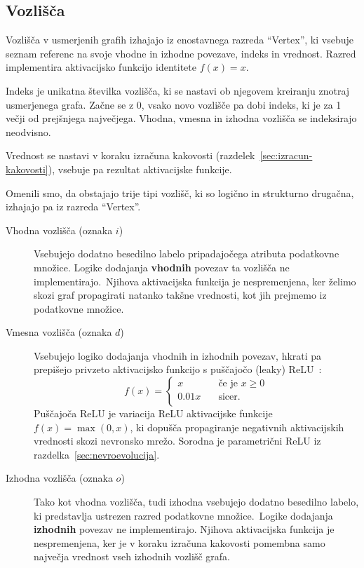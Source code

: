 \documentclass[a4paper,12pt,openright]{book}
\begin{document}
    \subsection{Vozlišča}\label{subsec:vozlisca}
    Vozlišča v usmerjenih grafih izhajajo iz enostavnega razreda \enquote{Vertex}, ki vsebuje seznam referenc
    na svoje vhodne in izhodne povezave, indeks in vrednost.
    Razred implementira aktivacijsko funkcijo identitete $f(x)=x$.

    Indeks je unikatna številka vozlišča, ki se nastavi ob njegovem kreiranju znotraj usmerjenega grafa.
    Začne se z 0, vsako novo vozlišče pa dobi indeks, ki je za 1 večji od prejšnjega največjega.
    Vhodna, vmesna in izhodna vozlišča se indeksirajo neodvisno.

    Vrednost se nastavi v koraku izračuna kakovosti (razdelek~\ref{sec:izracun-kakovosti}), vsebuje pa rezultat aktivacijske funkcije.

    Omenili smo, da obstajajo trije tipi vozlišč, ki so logično in strukturno drugačna, izhajajo
    pa iz razreda \enquote{Vertex}.
    \begin{description}
        \item[Vhodna vozlišča (oznaka $i$)]{Vsebujejo dodatno besedilno labelo pripadajočega atributa podatkovne množice.
        Logike dodajanja \textbf{vhodnih} povezav ta vozlišča ne implementirajo.\ Njihova aktivacijska funkcija je nespremenjena, ker
        želimo skozi graf propagirati natanko takšne vrednosti, kot jih prejmemo iz podatkovne množice. }
        \item[Vmesna vozlišča (oznaka $d$)]{Vsebujejo logiko dodajanja vhodnih in izhodnih povezav, hkrati pa prepišejo
        privzeto aktivacijsko funkcijo s puščajočo (leaky) ReLU~\cite{maas2013rectifier}:
        \begin{equation}
            f(x)=
            \begin{cases}
                x & \quad\text{če je } x\ge0\\
                0.01x & \quad\text{sicer}.\\
            \end{cases}
            \label{eq:leaky_relu}
        \end{equation}
        Puščajoča ReLU je variacija ReLU aktivacijske funkcije $f(x)=\max(0,x)$, ki dopušča propagiranje negativnih aktivacijskih
        vrednosti skozi nevronsko mrežo. Sorodna je parametrični ReLU iz razdelka~\ref{sec:nevroevolucija}.}
        \item[Izhodna vozlišča (oznaka $o$)]{Tako kot vhodna vozlišča, tudi izhodna vsebujejo dodatno besedilno labelo, ki predstavlja
        ustrezen razred podatkovne mno\-ži\-ce.\ Logike dodajanja \textbf{izhodnih} povezav ne implementirajo.
        Njihova aktivacijska funkcija je nespremenjena, ker je v koraku izračuna kakovosti pomembna samo največja
        vrednost vseh izhodnih vozlišč grafa. }
    \end{description}
\end{document}
